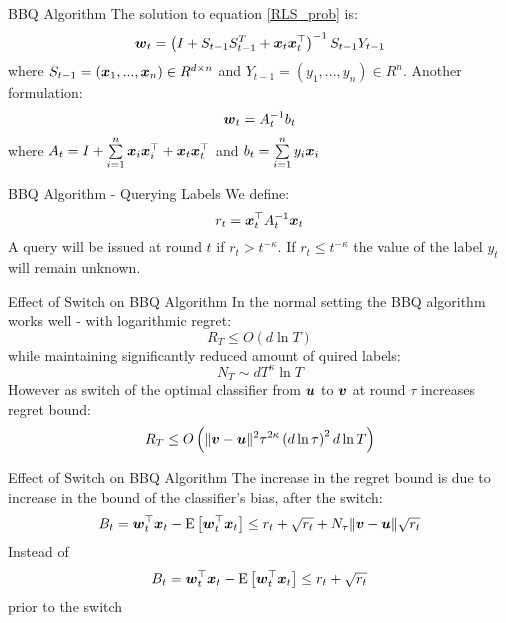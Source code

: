 \documentclass{beamer}
\begin{document}
\begin{frame}{BBQ Algorithm}
The solution to equation \ref{RLS_prob} is:
\begin{equation}
{\boldsymbol{w}}_{t}=\left(I+S_{t-1}S_{t-1}^T+ {\boldsymbol{x}}_{t} {{\boldsymbol{x}}}^{\top}_{t}\right)^{-1}S_{t-1}Y_{t-1}
\label{RLS}
\end{equation}
where $S_{t-1}=({\boldsymbol{x}}_{1},...,{\boldsymbol{x}}_{n})\in R^{d\times n}$ and $Y_{t-1}=(y_1,...,y_n)\in R^n$.\newline
Another formulation:
\begin{equation}
{\boldsymbol{w}}_{t}=A_{t}^{-1}b_t
\label{RLS2}
\end{equation}
where $A_t=I+\sum\limits_{i=1}^{n}{\boldsymbol{x}}_{i} {{\boldsymbol{x}}}^{\top}_{i}+ {\boldsymbol{x}}_{t} {{\boldsymbol{x}}}^{\top}_{t}$ and $b_t=\sum\limits_{i=1}^{n}y_i{\boldsymbol{x}}_{i}$ 
\end{frame}

\begin{frame}{BBQ Algorithm - Querying Labels}
We define:
\begin{equation}
r_t={{\boldsymbol{x}}}^{\top}_{t}A_{t}^{-1}{\boldsymbol{x}}_{t}
\end{equation}
\newline
\newline
A query will be issued at round $t$ if $r_t> t^{-\kappa}$.\newline
\newline
\newline
If $r_t\leq t^{-\kappa}$ the value of the label $y_t$ will remain unknown.
\end{frame}

\begin{frame}{Effect of Switch on BBQ Algorithm}
In the normal setting the BBQ algorithm works well - with logarithmic regret:
\begin{equation}
 R_T\leq O\left(d\ln{T}\right)
\end{equation}
while maintaining significantly reduced amount of quired labels:
\begin{equation}
N_T\sim dT^{\kappa}\ln{T}
\end{equation}
However as switch of the optimal classifier from ${\boldsymbol{u}}$ to ${\boldsymbol{v}}$ at round $\tau$ increases regret bound:
\begin{equation}
 R_T\leq O\left(\|{\boldsymbol{v}}-{\boldsymbol{u}}\|^2{\tau}^{2\kappa}\left(d\ln{\tau}\right)^2d\ln{T}\right)
\end{equation}
 
\end{frame}


\begin{frame}{Effect of Switch on BBQ Algorithm}
The increase in the regret bound is due to increase in the bound of the classifier's bias, after the switch:
\begin{equation}
B_t={{\boldsymbol{w}}}^{\top}_{t}{\boldsymbol{x}}_{t}-{\rm E}\left[{{{\boldsymbol{w}}}^{\top}_{t}{\boldsymbol{x}}_{t}}\right]\leq r_t+\sqrt{r_t}+N_{\tau}\|{\boldsymbol{v}}-{\boldsymbol{u}}\|\sqrt{r_t}
\end{equation}
Instead of 
\begin{equation}
B_t={{\boldsymbol{w}}}^{\top}_{t}{\boldsymbol{x}}_{t}-{\rm E}\left[{{{\boldsymbol{w}}}^{\top}_{t}{\boldsymbol{x}}_{t}}\right]\leq r_t+\sqrt{r_t}
\end{equation}
prior to the switch
\end{frame}
\end{document}
